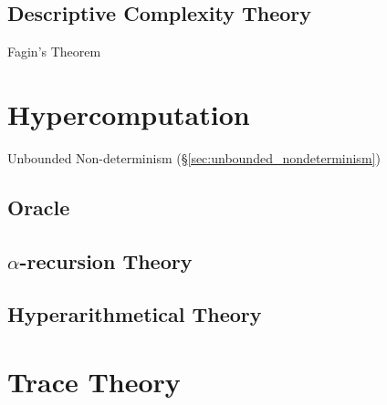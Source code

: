 \subsection{Descriptive Complexity Theory}\label{sec:descriptive_complexity}

Fagin's Theorem



\section{Hypercomputation}\label{sec:hypercomputation}

Unbounded Non-determinism (\S\ref{sec:unbounded_nondeterminism})



\subsection{Oracle}\label{sec:oracle}

\subsection{$\alpha$-recursion Theory}\label{sec:alpha_recursion}

\subsection{Hyperarithmetical Theory}\label{sec:hyperarithmetical_theory}



\section{Trace Theory}\label{sec:trace_theory}

